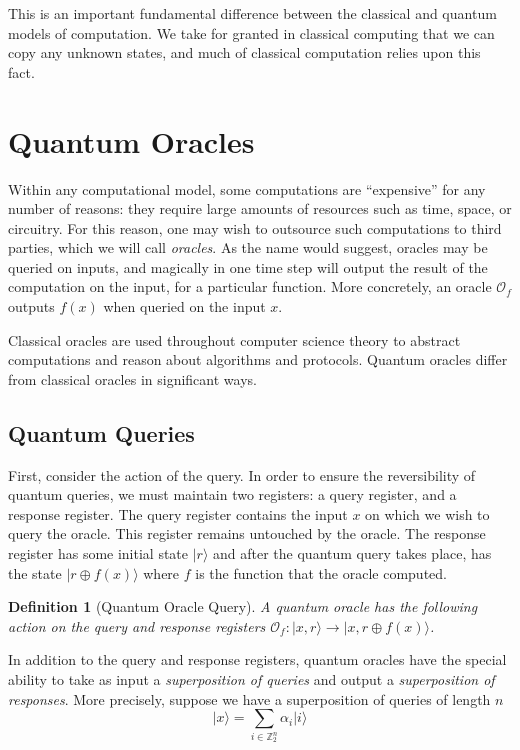 \documentclass[12pt,twoside]{reedthesis}
\newtheorem{definition}{Definition}
\newcommand{\Z}{\mathbb{Z}}
\newcommand{\ket}[1]{\ensuremath{\lvert #1\rangle}\xspace}
\begin{document}
This is an important fundamental difference between the classical and quantum models of computation. We take for granted in classical computing that we can copy any unknown states, and much of classical computation relies upon this fact. 

\section{Quantum Oracles}

Within any computational model, some computations are ``expensive'' for any number of reasons: they require large amounts of resources such as time, space, or circuitry. For this reason, one may wish to outsource such computations to third parties, which we will call \textit{oracles}. As the name would suggest, oracles may be queried on inputs, and magically in one time step will output the result of the computation on the input, for a particular function. More concretely, an oracle $\mathcal{O}_f$ outputs $f(x)$ when queried on the input $x$.

Classical oracles are used throughout computer science theory to abstract computations and reason about algorithms and protocols. Quantum oracles differ  from classical oracles in significant ways. 

\subsection{Quantum Queries}
First, consider the action of the query. In order to ensure the reversibility of quantum queries, we must maintain two registers: a query register, and a response register. The query register contains the input $x$ on which we wish to query the oracle. This register remains untouched by the oracle. The response register has some initial state $\ket{r}$ and after the quantum query takes place, has the state $\ket{r\oplus f(x)}$ where $f$ is the function that the oracle computed. 

\begin{definition}[Quantum Oracle Query] A quantum oracle has the following action on the query and response registers $\mathcal{O}_f : \ket{x, r} \rightarrow \ket{x, r \oplus f(x)}$.
\end{definition}

In addition to the query and response registers, quantum oracles have the special ability to take as input a \textit{superposition of queries} and output a \textit{superposition of responses}. More precisely, suppose we have a superposition of queries of length $n$ 
\begin{equation*}
\ket{x} = \sum_{i \in \Z_2^n} \alpha_i \ket{i}
\end{equation*}
\end{document}
